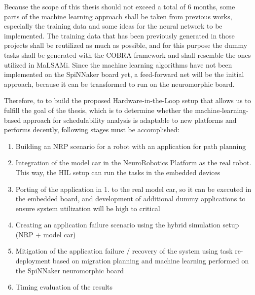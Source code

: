 Because the scope of this thesis should not exceed a total of 6 months, some parts of the machine learning approach shall be taken from previous works, especially the training data and some ideas for the neural network to be implemented. The training data that has been previously generated in those projects shall be reutilized as much as possible, and for this purpose the dummy tasks shall be generated with the COBRA framework and shall resemble the ones utilized in MaLSAMi. Since the machine learning algorithms have not been implemented on the SpiNNaker board yet, a feed-forward net will be the initial approach, because it can be transformed to run on the neuromorphic board.

Therefore, to to build the proposed Hardware-in-the-Loop setup that allows us to fulfill the goal of the thesis, which is to determine whether the machine-learning-based approach for schedulability analysis is adaptable to new platforms and performs decently, following stages must be accomplished:
\begin{enumerate}
\item	Building an NRP scenario for a robot with an application for path planning
\item	Integration of the model car in the NeuroRobotics Platform as the real robot. This way, the HIL setup can run the tasks in the embedded devices
\item	Porting of the application in 1. to the real model car, so it can be executed in the embedded board, and development of additional dummy applications to ensure system utilization will be high to critical
\item	Creating an application failure scenario using the hybrid simulation setup (NRP + model car)
\item	Mitigation of the application failure / recovery of the system using task re-deployment based on migration planning and machine learning performed on the SpiNNaker neuromorphic board
\item	Timing evaluation of the results
\end{enumerate}

